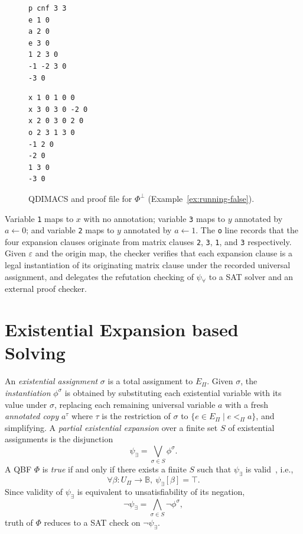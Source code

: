 \documentclass{article}
\begin{document}
\begin{figure}[t]
    \centering
    \begin{minipage}{0.45\columnwidth}
        \begin{mdframed}
            \begin{verbatim}
p cnf 3 3
e 1 0
a 2 0
e 3 0
1 2 3 0
-1 -2 3 0
-3 0

\end{verbatim}
        \end{mdframed}
    \end{minipage}
    \hfill
    \begin{minipage}{0.45\columnwidth}
        \begin{mdframed}
            \begin{verbatim}
x 1 0 1 0 0
x 3 0 3 0 -2 0
x 2 0 3 0 2 0
o 2 3 1 3 0
-1 2 0
-2 0
1 3 0
-3 0
\end{verbatim}
        \end{mdframed}
    \end{minipage}
    \caption{QDIMACS and proof file for $\Phi^\bot$
        (Example~\ref{ex:running-false}).}
    \label{fig:false-proof}
\end{figure}

Variable \texttt{1} maps to $x$ with no annotation; variable \texttt{3} maps to
$y$ annotated by $a \leftarrow 0$; and variable \texttt{2} maps to $y$ annotated
by $a \leftarrow 1$. The \texttt{o} line records that the four expansion clauses
originate from matrix clauses \texttt{2}, \texttt{3}, \texttt{1}, and \texttt{3}
respectively. Given $\varepsilon$ and the origin map, the checker verifies
that each expansion clause is a legal instantiation of its originating matrix
clause under the recorded universal assignment, and delegates the refutation
checking of $\psi_\forall$ to a SAT solver and an external proof checker.

\section{Existential Expansion based Solving}
\label{sec:existential}
An \emph{existential assignment} $\sigma$ is a total assignment to $E_\Pi$. Given
$\sigma$, the \emph{instantiation} $\phi^\sigma$ is obtained by substituting each
existential variable with its value under $\sigma$, replacing each remaining
universal variable $a$ with a fresh \emph{annotated copy} $a^\tau$ where $\tau$ is
the restriction of $\sigma$ to $\{e \in E_\Pi \mid e <_\Pi a\}$, and simplifying.
A \emph{partial existential expansion} over a finite set $S$ of existential
assignments is the disjunction
\[
    \psi_\exists = \bigvee_{\sigma \in S} \phi^\sigma.
\]
A QBF $\Phi$ is \emph{true} if and only if there exists a finite $S$ such that
$\psi_\exists$ is valid~\cite{itjihad}, i.e.,
\[
    \forall \beta : U_\Pi \to \mathbb{B},\ \psi_\exists[\beta] = \top.
\]
Since validity of $\psi_\exists$ is equivalent to unsatisfiability of its negation,
\[
    \neg\psi_\exists = \bigwedge_{\sigma \in S} \neg\phi^\sigma,
\]
truth of $\Phi$ reduces to a SAT check on $\neg\psi_\exists$.
\end{document}
